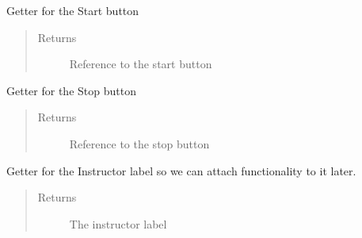 \documentclass[letterpaper,10pt,english]{sphinxmanual}
\begin{document}
\begin{fulllineitems}
\begin{fulllineitems}
\begin{quote}
\begin{description}
\end{description}\end{quote}

\end{fulllineitems}


\begin{fulllineitems}
\label{\detokenize{index:src.Views.View_TrackingScreen.TrackingWindow.set_BtnStart}}
Getter for the Start button
\begin{quote}\begin{description}
\item[{Returns}] \leavevmode
Reference to the start button

\end{description}\end{quote}

\end{fulllineitems}


\begin{fulllineitems}
\label{\detokenize{index:src.Views.View_TrackingScreen.TrackingWindow.set_BtnStop}}
Getter for the Stop button
\begin{quote}\begin{description}
\item[{Returns}] \leavevmode
Reference to the stop button

\end{description}\end{quote}

\end{fulllineitems}


\begin{fulllineitems}
\label{\detokenize{index:src.Views.View_TrackingScreen.TrackingWindow.set_LblInstructor}}
Getter for the Instructor label so we can attach functionality to it later.
\begin{quote}\begin{description}
\item[{Returns}] \leavevmode
The instructor label


\end{description}
\end{quote}
\end{fulllineitems}
\end{fulllineitems}
\end{document}
